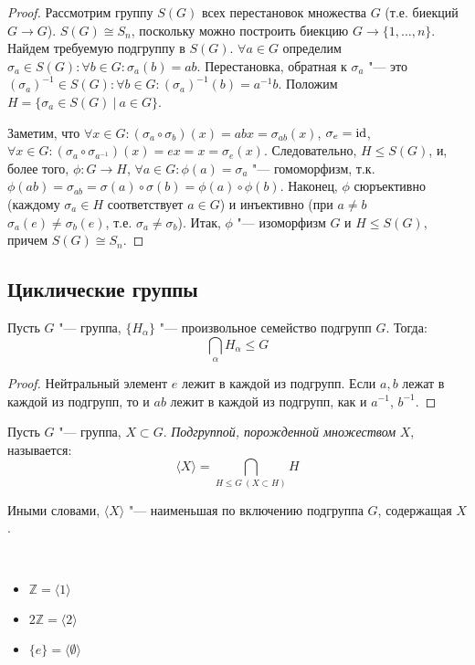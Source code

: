 \begin{proof}
	Рассмотрим группу $S(G)$ всех перестановок множества $G$ (т.\:е. биекций $G \rightarrow G$). $S(G) \cong S_n$, поскольку можно построить биекцию $G \rightarrow \{1, \dots, n\}$. Найдем требуемую подгруппу в $S(G)$. $\forall a \in G$ определим	$\sigma_a \in S(G): \forall b \in G: \sigma_a(b) = ab$. Перестановка, обратная к $\sigma_a$ "--- это $(\sigma_a)^{-1} \in S(G): \forall b \in G: (\sigma_a)^{-1}(b) = a^{-1}b$. Положим $H = \{\sigma_a \in S(G)~|~a \in G\}$.
	
	Заметим, что $\forall x \in G: (\sigma_a \circ \sigma_b)(x) = abx = \sigma_{ab}(x)$, $\sigma_e = \mathrm{id}$, $\forall x \in G: (\sigma_a \circ \sigma_{a^{-1}})(x) = ex = x = \sigma_e(x)$. Следовательно, $H \le S(G)$, и, более того, $\phi: G \rightarrow H$, $\forall a \in G: \phi(a) = \sigma_a$ "--- гомоморфизм, т.\:к. $\phi(ab) = \sigma_{ab} = \sigma(a) \circ \sigma(b) = \phi(a)\circ\phi(b)$. Наконец, $\phi$ сюръективно (каждому $\sigma_a \in H$ соответствует $a \in G$) и инъективно (при $a \ne b$ $\sigma_a(e) \ne \sigma_b(e)$, т.\:е. $\sigma_a \ne \sigma_b$). Итак, $\phi$ "--- изоморфизм $G$ и $H \le S(G)$, причем $S(G) \cong S_n$.
\end{proof}

\subsection{Циклические группы}

\begin{proposition}
	Пусть $G$ "--- группа, $\{H_\alpha\}$ "--- произвольное семейство подгрупп $G$. Тогда:
	\[\bigcap_{\alpha} H_\alpha \le G\]
\end{proposition}

\begin{proof}
	Нейтральный элемент $e$ лежит в каждой из подгрупп. Если $a, b$ лежат в каждой из подгрупп, то и $ab$ лежит в каждой из подгрупп, как и $a^{-1}$, $b^{-1}$.
\end{proof}

\begin{definition}
	Пусть $G$ "--- группа, $X \subset G$. \textit{Подгруппой, порожденной множеством} $X$, называется:
	\[\langle X\rangle = \bigcap_{H \le G~(X \subset H)}H\]
	
	Иными словами, $\langle X\rangle$ "--- наименьшая по включению подгруппа $G$, содержащая $X$.
\end{definition}

\begin{example}~
	\begin{itemize}
		\item $\mathbb{Z} = \langle 1 \rangle$
		\item $2\mathbb{Z} = \langle 2 \rangle$
		\item $\{e\} = \langle \emptyset \rangle$
	\end{itemize}
\end{example}

